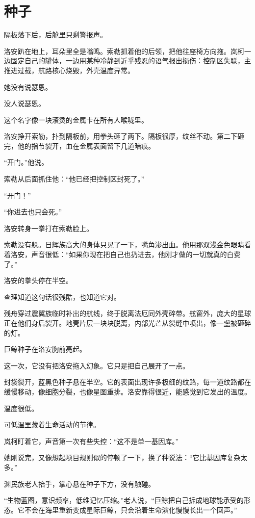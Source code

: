\chapter{种子}

隔板落下后，后舱里只剩警报声。

洛安趴在地上，耳朵里全是嗡鸣。索勒抓着他的后领，把他往座椅方向拖。岚柯一边固定自己的罐体，一边用某种冷静到近乎残忍的语气报出损伤：控制区失联，主推进过载，航路核心烧毁，外壳温度异常。

她没有说瑟恩。

没人说瑟恩。

这个名字像一块滚烫的金属卡在所有人喉咙里。

洛安挣开索勒，扑到隔板前，用拳头砸了两下。隔板很厚，纹丝不动。第二下砸完，他的指节裂开，血在金属表面留下几道暗痕。

“开门。”他说。

索勒从后面抓住他：“他已经把控制区封死了。”

“开门！”

“你进去也只会死。”

洛安转身一拳打在索勒脸上。

索勒没有躲。日辉族高大的身体只晃了一下，嘴角渗出血。他用那双浅金色眼睛看着洛安，声音很低：“如果你现在把自己也扔进去，他刚才做的一切就真的白费了。”

洛安的拳头停在半空。

查理知道这句话很残酷，也知道它对。

残舟穿过震翼族临时补出的航线，终于脱离法厄同外壳碎带。舷窗外，庞大的星球正在他们身后裂开。地壳片层一块块脱离，内部光芒从裂缝中喷出，像一盏被砸碎的灯。

巨鲸种子在洛安胸前亮起。

这一次，它没有把洛安拖入幻象。它只是把自己展开了一点。

封袋裂开，蓝黑色种子悬在半空。它的表面出现许多极细的纹路，每一道纹路都在缓慢移动，像细胞分裂，也像星图重排。洛安靠得很近，能感觉到它发出的温度。

温度很低。

可低温里藏着生命活动的节律。

岚柯盯着它，声音第一次有些失控：“这不是单一基因库。”

她刚说完，又像想起项目规则似的停顿了一下，换了种说法：“它比基因库复杂太多。”

渊民族老人抬手，掌心悬在种子下方，没有触碰。

“生物蓝图，意识频率，低维记忆压缩。”老人说，“巨鲸把自己拆成地球能承受的形态。它不会在海里重新变成星际巨鲸，只会沿着生命演化慢慢长出一个回声。”


